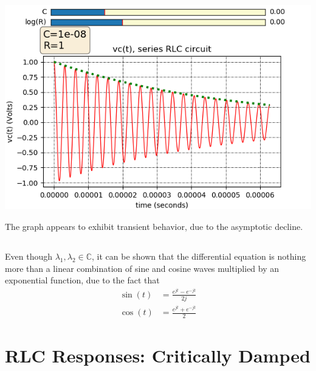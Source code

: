 \documentclass[]{article}
\begin{document}
\subsection{}

\begin{center}
	\includegraphics[width=0.7\linewidth]{underdamped}
\end{center}

\begin{center}
\end{center}
The graph appears to exhibit transient behavior, due to the asymptotic decline.

\subsection{}

Even though \(\lambda_1, \lambda_2 \in \mathbb{C}\), it can be shown that the differential equation is nothing more than a linear combination of sine and cosine waves multiplied by an exponential function, due to the fact that
\begin{align}
	\sin(t) &= \frac{e^{jt} - e^{-jt}}{2j} \\
	\cos(t) &= \frac{e^{jt} + e^{-jt}}{2}
\end{align}

\section{RLC Responses: Critically Damped}
\end{document}
